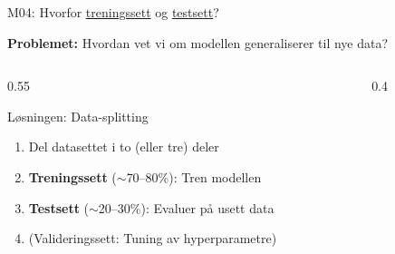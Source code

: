 \documentclass[aspectratio=169, 10pt]{beamer}
\begin{document}
\begin{frame}{M04: Hvorfor \href{https://en.wikipedia.org/wiki/Training,_validation,_and_test_data_sets\#Training_data_set}{treningssett} og \href{https://en.wikipedia.org/wiki/Training,_validation,_and_test_data_sets\#Test_data_set}{testsett}?}

    \textbf{Problemet:} Hvordan vet vi om modellen generaliserer til nye data?

    \vspace{2mm}
    \begin{columns}
        \begin{column}{0.55\textwidth}
            \begin{block}{\footnotesize Løsningen: Data-splitting}
                \footnotesize
                \begin{enumerate}
                    \item Del datasettet i to (eller tre) deler
                    \item \textbf{Treningssett} ($\sim$70--80\%): Tren modellen
                    \item \textbf{Testsett} ($\sim$20--30\%): Evaluer på usett data
                    \item (Valideringssett: Tuning av hyperparametre)
                \end{enumerate}
            \end{block}
        \end{column}

        \begin{column}{0.4\textwidth}
        \end{column}
    \end{columns}


\end{frame}
\end{document}
